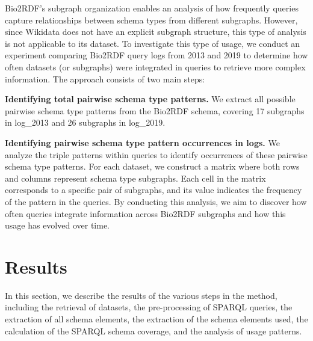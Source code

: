 \documentclass[sw]{iosart2x}
\begin{document}
Bio2RDF’s subgraph organization enables an analysis of how frequently queries capture relationships between schema types from different subgraphs. However, since Wikidata does not have an explicit subgraph structure, this type of analysis is not applicable to its dataset. To investigate this type of usage, we conduct an experiment comparing Bio2RDF query logs from 2013 and 2019 to determine how often datasets (or subgraphs) were integrated in queries to retrieve more complex information. The approach consists of two main steps:

\textbf{Identifying total pairwise schema type patterns.} We extract all possible pairwise schema type patterns from the Bio2RDF schema, covering 17 subgraphs in log\_2013 and 26 subgraphs in log\_2019.


\textbf{Identifying pairwise schema type pattern occurrences in logs.} We analyze the triple patterns within queries to identify occurrences of these pairwise schema type patterns. For each dataset, we construct a matrix where both rows and columns represent schema type subgraphs. Each cell in the matrix corresponds to a specific pair of subgraphs, and its value indicates the frequency of the pattern in the queries.
By conducting this analysis, we aim to discover how often queries integrate information across Bio2RDF subgraphs and how this usage has evolved over time.

\section{Results}\label{s4}
In this section, we describe the results of the various steps in the method, including the retrieval of datasets, the pre-processing of SPARQL queries, the extraction of all schema elements, the extraction of the schema elements used, the calculation of the SPARQL schema coverage, and the analysis of usage patterns.
\end{document}
